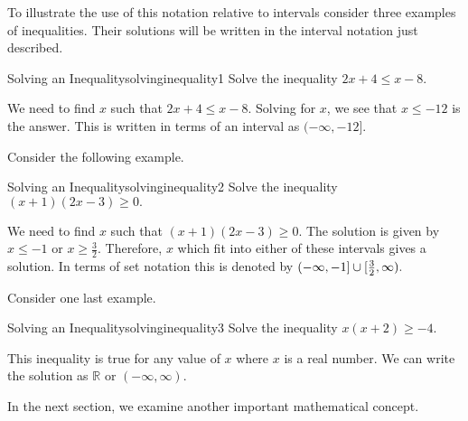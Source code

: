 To illustrate the use of this notation relative to intervals consider three
examples of inequalities. Their solutions will be written in the interval notation
just described.

\begin{example}{Solving an Inequality}{solvinginequality1}
Solve the inequality $2x+4\leq x-8$.
\end{example}

\begin{solution}
We need to find $x$ such that $2x+4\leq x-8$. Solving for $x$, we see that 
$x\leq -12$ is the answer. This is written in terms of an interval as $(-\infty ,-12].$
\end{solution}

Consider the following example.

\begin{example}{Solving an Inequality}{solvinginequality2}
Solve the inequality $\left( x+1\right) \left( 2x-3\right) \geq0.$
\end{example}

\begin{solution}
We need to find $x$ such that $\left( x+1\right) \left( 2x-3\right) \geq0.$ 
The solution is given by  $x\leq -1$ or $x\geq \frac{3}{2}$. Therefore, 
$x$ which fit into either of these intervals gives a solution. In terms of set notation this is denoted by $(-\infty ,-1]\cup
[ \vspace{0.05in}\frac{3}{2},\infty ).$
\end{solution}

Consider one last example.

\begin{example}{Solving an Inequality}{solvinginequality3}
Solve the inequality $x \left( x+2\right) \geq-4$.
\end{example}

\begin{solution}
This inequality is true for any value of $x$ where $x$ is a real number. We can write the solution as $\mathbb{R}$ or $\left(
-\infty ,\infty \right) .$
\end{solution}

In the next section, we examine another important mathematical concept.